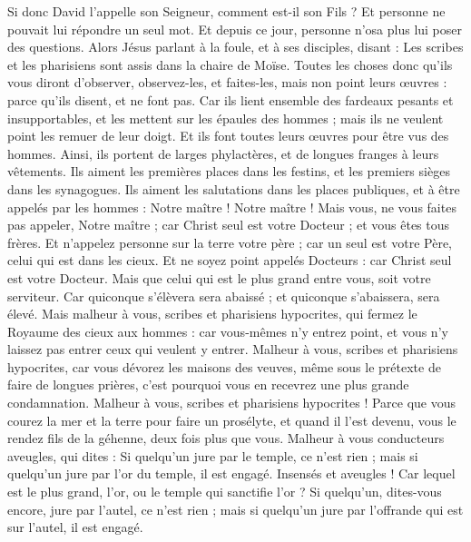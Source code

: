 \begin{multicols}{2}
Si donc David l'appelle son Seigneur, comment est-il son Fils ?
Et personne ne pouvait lui répondre un seul mot. Et depuis ce jour, personne n'osa plus lui poser des questions.
\VerseOne{}Alors Jésus parlant à la foule, et à ses disciples,
disant : Les scribes et les pharisiens sont assis dans la chaire de Moïse.
Toutes les choses donc qu'ils vous diront d'observer, observez-les, et faites-les, mais non point leurs œuvres : parce qu'ils disent, et ne font pas.
Car ils lient ensemble des fardeaux pesants et insupportables, et les mettent sur les épaules des hommes ; mais ils ne veulent point les remuer de leur doigt.
Et ils font toutes leurs œuvres pour être vus des hommes. Ainsi, ils portent de larges phylactères, et de longues franges à leurs vêtements.
Ils aiment les premières places dans les festins, et les premiers sièges dans les synagogues.
Ils aiment les salutations dans les places publiques, et à être appelés par les hommes : Notre maître ! Notre maître !
Mais vous, ne vous faites pas appeler, Notre maître ; car Christ seul est votre Docteur ; et vous êtes tous frères.
Et n'appelez personne sur la terre votre père ; car un seul est votre Père, celui qui est dans les cieux.
Et ne soyez point appelés Docteurs : car Christ seul est votre Docteur.
Mais que celui qui est le plus grand entre vous, soit votre serviteur.
Car quiconque s'élèvera sera abaissé ; et quiconque s'abaissera, sera élevé.
Mais malheur à vous, scribes et pharisiens hypocrites, qui fermez le Royaume des cieux aux hommes : car vous-mêmes n'y entrez point, et vous n'y laissez pas entrer ceux qui veulent y entrer.
Malheur à vous, scribes et pharisiens hypocrites, car vous dévorez les maisons des veuves, même sous le prétexte de faire de longues prières, c'est pourquoi vous en recevrez une plus grande condamnation.
Malheur à vous, scribes et pharisiens hypocrites ! Parce que vous courez la mer et la terre pour faire un prosélyte, et quand il l'est devenu, vous le rendez fils de la géhenne, deux fois plus que vous.
Malheur à vous conducteurs aveugles, qui dites : Si quelqu'un jure par le temple, ce n'est rien ; mais si quelqu'un jure par l'or du temple, il est engagé.
Insensés et aveugles ! Car lequel est le plus grand, l'or, ou le temple qui sanctifie l'or ?
Si quelqu'un, dites-vous encore, jure par l'autel, ce n'est rien ; mais si quelqu'un jure par l'offrande qui est sur l'autel, il est engagé.

\end{multicols}
